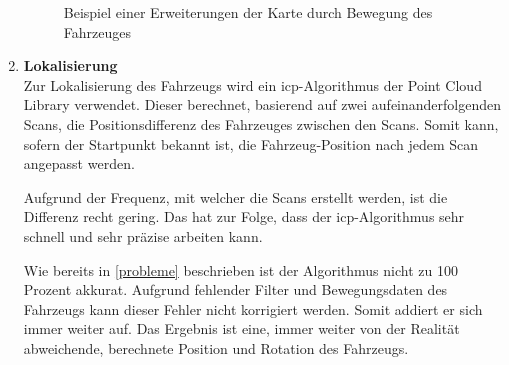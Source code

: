 \begin{enumerate}[leftmargin=*]
    \begin{figure}[H]
        \centering
        \caption{Beispiel einer Erweiterungen der Karte durch Bewegung des Fahrzeuges}
        \label{fig:mapErstellung}
    \end{figure}

    \item \textbf{Lokalisierung} \\
    Zur Lokalisierung des Fahrzeugs wird ein \ac{icp}-Algorithmus der Point Cloud Library verwendet.
    Dieser berechnet, basierend auf zwei aufeinanderfolgenden Scans, die Positionsdifferenz des Fahrzeuges zwischen den Scans.
    Somit kann, sofern der Startpunkt bekannt ist, die Fahrzeug-Position nach jedem Scan angepasst werden.

    Aufgrund der Frequenz, mit welcher die Scans erstellt werden, ist die Differenz recht gering.
    Das hat zur Folge, dass der \ac{icp}-Algorithmus sehr schnell und sehr präzise arbeiten kann.
    
    Wie bereits in \ref{probleme} beschrieben ist der Algorithmus nicht zu 100 Prozent akkurat.
    Aufgrund fehlender Filter und Bewegungsdaten des Fahrzeugs kann dieser Fehler nicht korrigiert werden.
    Somit addiert er sich immer weiter auf.
    Das Ergebnis ist eine, immer weiter von der Realität abweichende, berechnete Position und Rotation des Fahrzeugs.


\end{enumerate}
